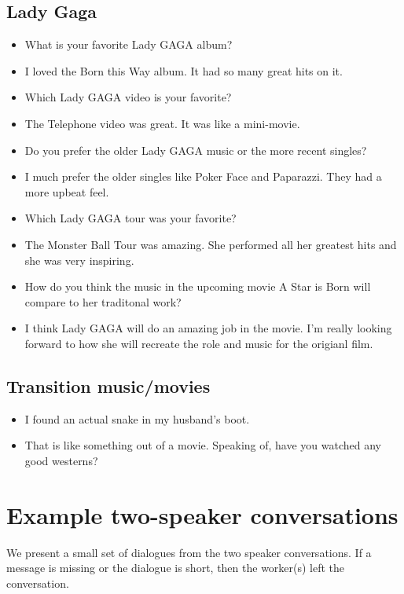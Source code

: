 \documentclass[11pt,a4paper]{article}
\begin{document}
\subsection{Lady Gaga}\label{sec:lady_gaga}
\begin{itemize}
\itemsep0em
\item[\ding{172}] What is your favorite Lady GAGA album?
\item[\ding{173}] I loved the Born this Way album.  It had so many great hits on it.
\item[\ding{172}] Which Lady GAGA video is your favorite?
\item[\ding{173}] The Telephone video was great.  It was like a mini-movie.
\item[\ding{172}] Do you prefer the older Lady GAGA music or the more recent singles?
\item[\ding{173}] I much prefer the older singles like Poker Face and Paparazzi.  They had a more upbeat feel.
\item[\ding{172}] Which Lady GAGA tour was your favorite?
\item[\ding{173}] The Monster Ball Tour was amazing.  She performed all her greatest hits and she was very inspiring.
\item[\ding{172}] How do you think the music in the upcoming movie A Star is Born will compare to her traditonal work?
\item[\ding{173}] I think Lady GAGA will do an amazing job in the movie.  I'm really looking forward to how she will recreate the role and music for the origianl film.
\end{itemize}
\subsection{Transition music/movies}
\label{sec:transition_music_movies}
\begin{itemize}
\itemsep0em
\item[\ding{172}] I found an actual snake in my husband's boot.
\item[\ding{173}] That is like something out of a movie. Speaking of, have you watched any good westerns?
\end{itemize}


\section{Example two-speaker conversations}
\label{sec:two_person_conversations}
We present a small set of dialogues from the two speaker conversations. If a message is missing or the dialogue is short, then the worker(s) left the conversation.
\end{document}
